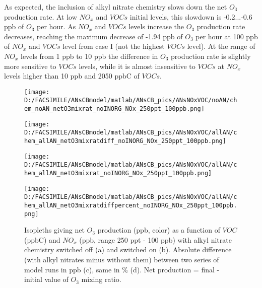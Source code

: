 \documentclass[11pt,a4paper]{article}
\begin{document}
As expected, the inclusion of alkyl nitrate chemistry slows down the net $O_3$ production rate. At low $NO_x$ and $VOCs$ initial levels, this slowdown is -0.2...-0.6 ppb of $O_3$ per hour. As $NO_x$ and $VOCs$ levels increase the $O_3$ production rate decreases, reaching the maximum decrease of -1.94 ppb of $O_3$ per hour at 100 ppb of $NO_x$ and $VOCs$ level from case I (not the highest $VOCs$ level). At the range of $NO_x$ levels from 1 ppb to 10 ppb the difference in $O_3$ production rate is slightly more sensitive to $VOCs$ levels, while it is almost insensitive to $VOCs$ at $NO_x$ levels higher than 10 ppb and 2050 ppbC of $VOCs$. 
\begin{figure} %
\centering
\begin{minipage}{.4\textwidth} %
  \centering
  \texttt{[image: D:/FACSIMILE/ANsCBmodel/matlab/ANsCB\_pics/ANsNOxVOC/noAN/chem\_noAN\_netO3mixrat\_noINORG\_NOx\_250ppt\_100ppb.png]}
\end{minipage}
\begin{minipage}{.4\textwidth} %
  \centering
  \texttt{[image: D:/FACSIMILE/ANsCBmodel/matlab/ANsCB\_pics/ANsNOxVOC/allAN/chem\_allAN\_netO3mixratdiff\_noINORG\_NOx\_250ppt\_100ppb.png]}
\end{minipage}
\begin{minipage}{.4\textwidth} %
  \centering
  \texttt{[image: D:/FACSIMILE/ANsCBmodel/matlab/ANsCB\_pics/ANsNOxVOC/allAN/chem\_allAN\_netO3mixrat\_noINORG\_NOx\_250ppt\_100ppb.png]}
\end{minipage}
\begin{minipage}{.4\textwidth} %
  \centering
  \texttt{[image: D:/FACSIMILE/ANsCBmodel/matlab/ANsCB\_pics/ANsNOxVOC/allAN/chem\_allAN\_netO3mixratdiffpercent\_noINORG\_NOx\_250ppt\_100ppb.png]}
\end{minipage}
\caption{Isopleths giving net $O_3$ production (ppb, color) as a function of $VOC$ (ppbC) and $NO_x$ (ppb, range 250 ppt - 100 ppb) with alkyl nitrate chemistry switched off (a) and switched on (b). Absolute difference (with alkyl nitrates minus without them) between two series of model runs in ppb (c), same in \% (d). Net production = final - initial value of $O_3$ mixing ratio.}\label{fig:netO3mixrat_noAN_withAN_diff}
\end{figure}
\end{document}
